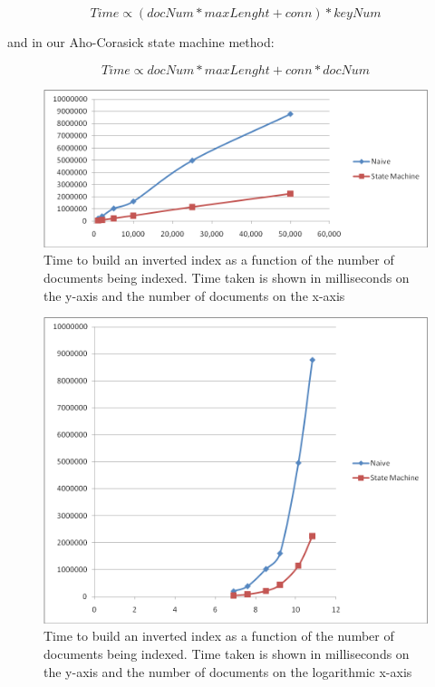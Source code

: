 \documentclass[10pt]{report}
\begin{document}
\[Time \propto (docNum * maxLenght + conn) * keyNum\]
 
and in our Aho-Corasick state machine method: 

\[Time \propto docNum * maxLenght + conn * docNum\]


\begin{figure}[p]
  \begin{center}
    \includegraphics[width=\textwidth,height=!]{naivesizecorpus}
  \end{center}
  \caption{Time to build an inverted index as a function of the
      number of documents being indexed. Time taken is shown in
      milliseconds on the y-axis and the number of documents on the
      x-axis} 
  \label{fig:naivesizecorpus}
\end{figure} 


\begin{figure}[p]
  \begin{center}
    \includegraphics[width=\textwidth,height=!]{naivesizecorpuslog}
  \end{center}
  \caption{Time to build an inverted index as a function of the
      number of documents being indexed. Time taken is shown in
      milliseconds on the y-axis and the number of documents on the
      logarithmic x-axis} 
  \label{fig:naivesizecorpuslog}
\end{figure} 
\end{document}
